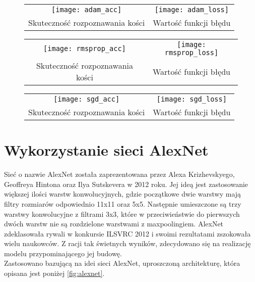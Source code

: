 \begin{figure}[h!]
\begin{center}
\begin{tabular}{cc}
\texttt{[image: adam\_acc]} &
\texttt{[image: adam\_loss]} \\
 Skuteczność rozpoznawania kości & Wartość funkcji błędu\\
\end{tabular}
\label{fig:comparison_adam}
\end{center}
\end{figure}

\begin{figure}[h!]
\begin{center}
\begin{tabular}{cc}
\texttt{[image: rmsprop\_acc]} &
\texttt{[image: rmsprop\_loss]} \\
 Skuteczność rozpoznawania kości & Wartość funkcji błędu\\
\end{tabular}
\label{fig:comparison_rmsprop}
\end{center}
\end{figure}

\begin{figure}[h!]
\begin{center}
\begin{tabular}{cc}
\texttt{[image: sgd\_acc]} &
\texttt{[image: sgd\_loss]} \\
 Skuteczność rozpoznawania kości & Wartość funkcji błędu\\
\end{tabular}
\label{fig:comparison_sgd}
\end{center}
\end{figure}
\newpage

\section{Wykorzystanie sieci AlexNet}
Sieć o nazwie AlexNet \cite{AlexNetNVIDIA, AlexNetdesc, AlexNetpresentation} została
zaprezentowana przez Alexa Krizhevskyego, Geoffreya Hintona oraz Ilya Sutskevera w 2012 roku.
Jej ideą jest zastosowanie większej ilości warstw konwolucyjnych, gdzie początkowe dwie warstwy
mają filtry rozmiarów odpowiednio 11x11 oraz 5x5. Następnie umieszczone są trzy warstwy
konwolucyjne z filtrami 3x3, które w przeciwieństwie do pierwszych
dwóch warstw nie są rozdzielone warstwami z maxpoolingiem. AlexNet zdeklasowała rywali
w konkursie ILSVRC 2012 i swoimi rezultatami zszokowała wielu naukowców. Z racji tak świetnych
wyników, zdecydowano się na realizację modelu przypominającego jej budowę.\\
Zastosowano bazującą na idei sieci AlexNet, uproszczoną architekturę, która opisana jest poniżej \ref{fig:alexnet}.

